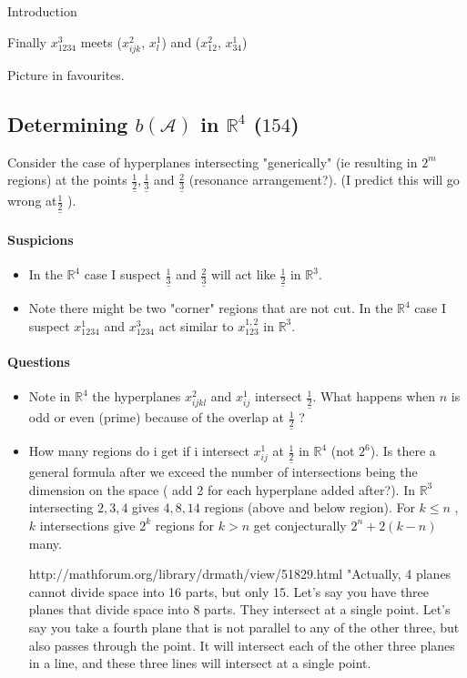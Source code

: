 \documentclass[a4paper,12pt]{article}
\theoremstyle{definition}
\theoremstyle{indented}
\newenvironment{titlemize}[1]{%
  \paragraph{#1}
  \begin{itemize}}
  {\end{itemize}}
\begin{document}
\begin{section}{Introduction}
\begin{enumerate}
    \subitem Finally $x_{1234}^3$ meets ($x_{ijk}^2$, $x_{l}^1$) and ($x_{12}^2$, $x_{34}^1$) 
\end{enumerate}
    
Picture in favourites.


\section{Determining $b(\mathcal{A})$ in $\mathbb{R}^4$ ($154$)}

Consider the case of hyperplanes intersecting "generically" (ie resulting in $2^m$ regions) at the points $\underline{\frac{1}{2}},  \underline{\frac{1}{3}}$ and  $\underline{\frac{2}{3}}$  (resonance arrangement?). (I predict this will go wrong  at$\underline{\frac{1}{2}}$ ).

\begin{titlemize}{Suspicions}


\item In the $\mathbb{R}^4$ case I suspect $\underline{\frac{1}{3}}$ and $\underline{\frac{2}{3}}$ will act like $\underline{\frac{1}{2}}$ in $\mathbb{R}^3$.

\item Note there might be two "corner" regions that are not cut. In the $\mathbb{R}^4$ case I suspect $x_{1234}^1$ and $x_{1234}^3$ act similar to $x_{123}^{1,2}$ in $\mathbb{R}^3$.

\end{titlemize}

\begin{titlemize}{Questions}
\item Note in $\mathbb{R}^4$ the hyperplanes $x_{ijkl}^2$ and $x_{ij}^1$ intersect $\underline{\frac{1}{2}}$. What happens when $n$ is odd or even (prime) because of the overlap at $\underline{\frac{1}{2}}$ ?

\item How many regions do i get if i intersect $x_{ij}^1$  at $\underline{\frac{1}{2}}$ in $\mathbb{R}^4$ (not $2^6$). Is there a general formula after we exceed the number of intersections being the dimension on the space ( add 2 for each hyperplane added after?). 
\subitem In $\mathbb{R}^3$ intersecting $2,3,4$ gives $4,8,14$ regions (above and below region). For $k\le n$ , $k$ intersections give $2^k$ regions for $k>n$ get conjecturally $2^{n} + 2(k-n)$ many. 

\subitem http://mathforum.org/library/drmath/view/51829.html "Actually, 4 planes cannot divide space into 16 parts, but only 15.  
Let's say you have three planes that divide space into 8 parts. They 
intersect at a single point. Let's say you take a fourth plane that is 
not parallel to any of the other three, but also passes through the 
point. It will intersect each of the other three planes in a line, and 
these three lines will intersect at a single point.


\end{titlemize}
\end{section}
\end{document}
